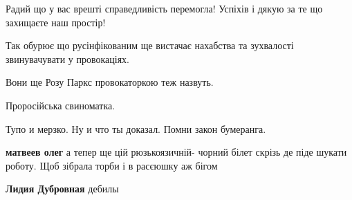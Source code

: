 \begin{itemize}
Радий що у вас врешті справедливість перемогла! Успіхів і дякую за те що захищаєте наш простір!

 

Так обурює що русінфікованим ще вистачає нахабства та зухвалості звинувачувати у провокаціях.

Вони ще Розу Паркс провокаторкою теж назвуть.

 
Проросійська свиноматка.

 
Тупо и мерзко. Ну и что ты доказал. Помни закон бумеранга.

\begin{itemize}
 
\textbf{матвеев олег} а тепер ще цій рюзькоязичній- чорний білет скрізь де піде шукати роботу. Щоб зібрала торби і в расєюшку аж бігом

 
\textbf{Лидия Дубровная} дебилы

 

\end{itemize}
\end{itemize}
